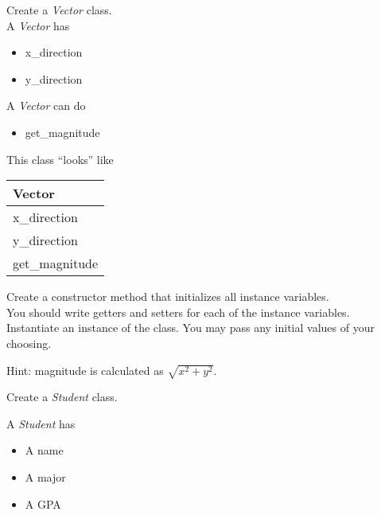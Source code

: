 \documentclass{article}
\begin{document}
\begin{enumerate}
	\begin{minipage}{.6\textwidth}
	\item Create a \textit{Vector} class.\\
		A \textit{Vector} has
		\begin{itemize}
			\item x\_direction 
			\item y\_direction
		\end{itemize}
		
		A \textit{Vector} can do
		\begin{itemize}
			\item get\_magnitude
		\end{itemize}
	\end{minipage}
	\begin{minipage}{.4\textwidth}
		This class ``looks'' like 
				
		\vspace*{1em}
		\begin{tabular}{|l|}
			\hline Vector\\ \hline
			x\_direction\\ y\_direction\\ \hline
			get\_magnitude\\  \hline
		\end{tabular}
	\end{minipage}

	\vspace*{2ex}
	Create a constructor method that initializes all instance variables.\\
	You should write getters and setters for each of the instance variables.\\
	Instantiate an instance of the class. You may pass any initial values of your choosing.
	
	Hint: magnitude is calculated as $\sqrt{x^2 + y^2}$.



	\item Create a \textit{Student} class.\\
	\begin{minipage}{.6\textwidth}		
		A \textit{Student} has
		\begin{itemize}
			\item A name
			\item A major
			\item A GPA	
		\end{itemize}
	

\end{minipage}
\end{enumerate}
\end{document}
